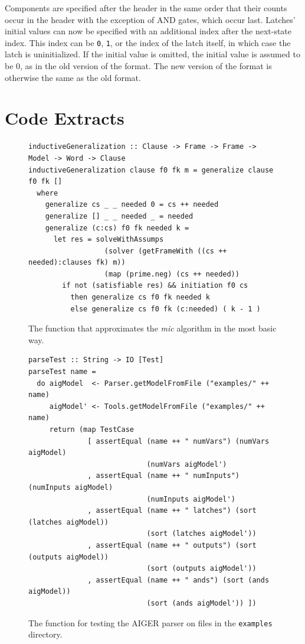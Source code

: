 \documentclass[12pt,a4paper,twoside,openright]{report}
\begin{document}
{{{Components are specified after the header in the same order that their
counts occur in the header with the exception of AND gates, which
occur last. Latches' initial values can now be specified
with an additional index after the next-state index.
This index can be \verb,0,, \verb,1,, or the index of the latch itself,
in which case the latch is uninitialized.
If the initial value is omitted, the initial value is assumed to be
0, as in the old version of the format.
The new version of the format is otherwise
the same as the old format.}

\chapter{Code Extracts}

\begin{figure}[H]
\centering
\begin{lstlisting}
inductiveGeneralization :: Clause -> Frame -> Frame -> Model -> Word -> Clause
inductiveGeneralization clause f0 fk m = generalize clause f0 fk []
  where
    generalize cs _ _ needed 0 = cs ++ needed
    generalize [] _ _ needed _ = needed
    generalize (c:cs) f0 fk needed k = 
      let res = solveWithAssumps
                  (solver (getFrameWith ((cs ++ needed):clauses fk) m))
                  (map (prime.neg) (cs ++ needed))
        if not (satisfiable res) && initiation f0 cs
          then generalize cs f0 fk needed k
          else generalize cs f0 fk (c:needed) ( k - 1 ) 
\end{lstlisting}
\caption{The function that approximates the {\it mic} algorithm in the most basic way.}
\label{inductiveGeneralization}
\end{figure}

\begin{figure}[H]
\begin{lstlisting}
parseTest :: String -> IO [Test]
parseTest name =
  do aigModel  <- Parser.getModelFromFile ("examples/" ++ name)
     aigModel' <- Tools.getModelFromFile ("examples/" ++ name)
     return (map TestCase
              [ assertEqual (name ++ " numVars") (numVars aigModel)
                            (numVars aigModel')
              , assertEqual (name ++ " numInputs") (numInputs aigModel)
                            (numInputs aigModel')
              , assertEqual (name ++ " latches") (sort (latches aigModel))
                            (sort (latches aigModel'))
              , assertEqual (name ++ " outputs") (sort (outputs aigModel))
                            (sort (outputs aigModel'))
              , assertEqual (name ++ " ands") (sort (ands aigModel))
                            (sort (ands aigModel')) ])
\end{lstlisting}
\caption{The function for testing the AIGER parser on files in the {\tt examples} directory.}
\label{parseTest}
\end{figure}

}}
\end{document}
